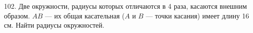 102. Две окружности, радиусы которых отличаются в 4 раза, касаются внешним образом. $AB$ --- их общая касательная ($A$ и $B$ --- точки касания) имеет длину 16 см. Найти радиусы окружностей.\\
